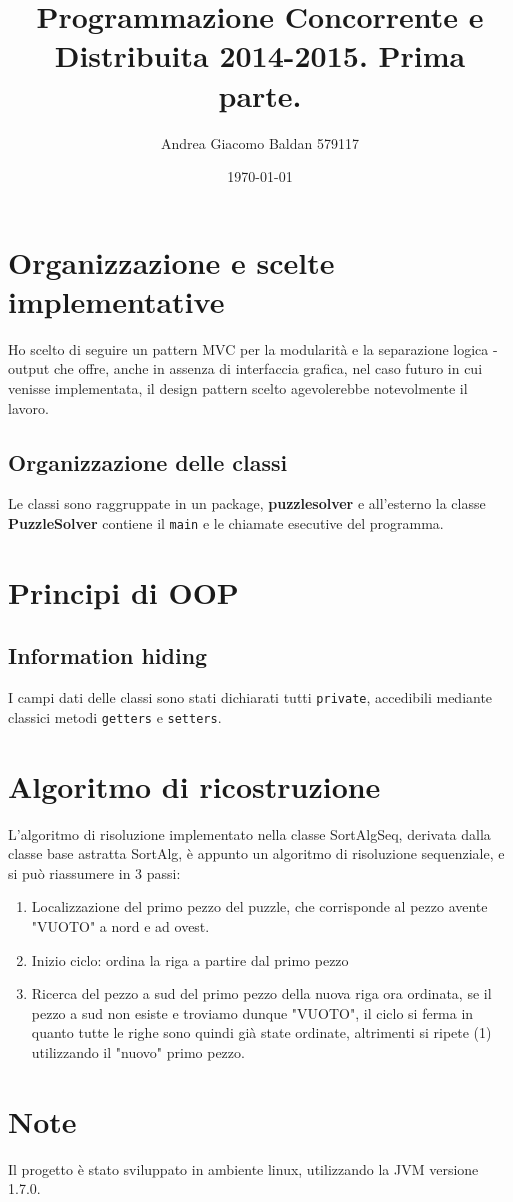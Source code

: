 \documentclass[11pt,a4paper]{article}
\author{Andrea Giacomo Baldan 579117}
\date{\today}
\title{Programmazione Concorrente e Distribuita 2014-2015. Prima parte.}
\begin{document}
\maketitle
\tableofcontents

\section{Organizzazione e scelte implementative}
\label{sec-1}
Ho scelto di seguire un pattern MVC per la modularità e la separazione logica - output che offre, anche in assenza di interfaccia grafica, nel caso futuro
in cui venisse implementata, il design pattern scelto agevolerebbe notevolmente il lavoro.
\subsection{Organizzazione delle classi}
\label{sec-1-1}
Le classi sono raggruppate in un package, \textbf{puzzlesolver} e all'esterno la classe \textbf{PuzzleSolver} contiene il \verb~main~ e le chiamate esecutive del programma.
\section{Principi di OOP}
\label{sec-2}
\subsection{Information hiding}
\label{sec-2-1}
I campi dati delle classi sono stati dichiarati tutti \verb~private~, accedibili mediante classici metodi \verb~getters~ e \verb~setters~.
\section{Algoritmo di ricostruzione}
\label{sec-3}
L'algoritmo di risoluzione implementato nella classe SortAlgSeq, derivata dalla classe base astratta SortAlg, è appunto un algoritmo di risoluzione 
sequenziale, e si può riassumere in 3 passi:
\begin{enumerate}
\item Localizzazione del primo pezzo del puzzle, che corrisponde al pezzo avente "VUOTO" a nord e ad ovest.
\item Inizio ciclo: ordina la riga a partire dal primo pezzo
\item Ricerca del pezzo a sud del primo pezzo della nuova riga ora ordinata, se il pezzo a sud non esiste e troviamo dunque "VUOTO", il ciclo si ferma 
in quanto tutte le righe sono quindi già state ordinate, altrimenti si ripete (1) utilizzando il "nuovo" primo pezzo.
\end{enumerate}
\section{Note}
\label{sec-4}
Il progetto è stato sviluppato in ambiente linux, utilizzando la JVM versione 1.7.0.
\end{document}
